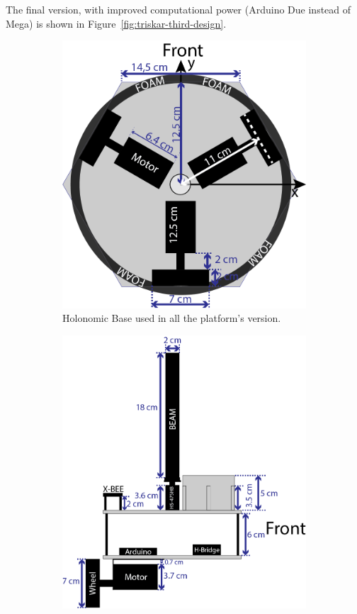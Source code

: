 The final version, with improved computational power (Arduino Due instead of Mega) is shown in Figure~\ref{fig:triskar-third-design}.
\begin{figure}
	\centering
	\begin{subfigure}[c]{0.3\textwidth}
	\centering
	\includegraphics[width=\textwidth]{./Images/TriskarThird.png}
	\caption{Holonomic Base used in all the platform's version.}
	\label{fig:holonomic-platform}
	\end{subfigure}
	\begin{subfigure}[c]{0.3\textwidth}
	\centering
	\includegraphics[width=\textwidth]{./Images/upperFirstB.png}

\end{subfigure}
\end{figure}
